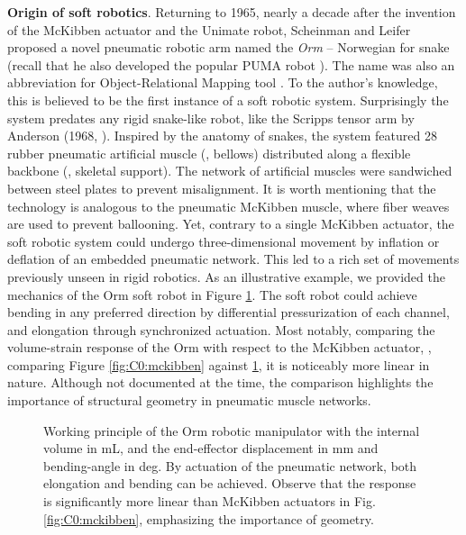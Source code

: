 \textbf{Origin of soft robotics}. Returning to 1965, nearly a decade after the invention of the McKibben actuator and the Unimate robot, Scheinman and Leifer proposed a novel pneumatic robotic arm named the \emph{Orm} -- Norwegian for snake (recall that he also developed the popular PUMA robot \cite{BibEntryPuma2022Sep}). The name was also an abbreviation for Object-Relational Mapping tool \cite{Corke2020}. To the author's knowledge, this is believed to be the first instance of a soft robotic system. Surprisingly the system predates any rigid snake-like robot, like the Scripps tensor arm by Anderson (1968, \cite{Anderson1968}). Inspired by the anatomy of snakes, the system featured 28 rubber pneumatic artificial muscle (\ie, bellows) distributed along a flexible backbone (\ie, skeletal support). The network of artificial muscles were sandwiched between steel plates to prevent misalignment. It is worth mentioning that the technology is analogous to the pneumatic McKibben muscle, where fiber weaves are used to prevent ballooning. Yet, contrary to a single McKibben actuator, the soft robotic system could undergo three-dimensional movement by inflation or deflation of an embedded pneumatic network. This led to a rich set of movements previously unseen in rigid robotics. As an illustrative example, we provided the mechanics of the Orm soft robot in Figure \ref{fig:C0:ormrobot}. The soft robot could achieve bending in any preferred direction by differential pressurization of each channel, and elongation through synchronized actuation. Most notably, comparing the volume-strain response of the Orm with respect to the McKibben actuator, \ie, comparing Figure \ref{fig:C0:mckibben} against \ref{fig:C0:ormrobot}, it is noticeably more linear in nature. Although not documented at the time, the comparison highlights the importance of structural geometry in pneumatic muscle networks.

\begin{figure}[!t]
  \ifx\printFigures\undefined
  \else
  \centering
  \vspace{-6mm}
  \fi
  
  \caption{Working principle of the Orm robotic manipulator \cite{BibEntryOrm2019Sep} with the internal volume  in \si{\milli \liter}, and the end-effector displacement  in \si{\milli \meter} and bending-angle  in deg. By actuation of the pneumatic network, both elongation and bending can be achieved. Observe that the response is significantly more linear than McKibben actuators in Fig. \ref{fig:C0:mckibben}, emphasizing the importance of geometry.
  \vspace{-6mm}
  \label{fig:C0:ormrobot}}
\end{figure}


